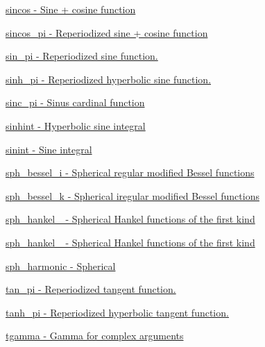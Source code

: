 \begin{DoxyItemize}
\item \hyperlink{group__gnu__math__spec__func_ga8041c24b528475bcf8a4178e484652a3}{sincos -\/ Sine + cosine function}
\item \hyperlink{group__gnu__math__spec__func_ga3152cfc9d5fa04fbe61781b45b3d4c04}{sincos\+\_\+pi -\/ Reperiodized sine + cosine function}
\item \hyperlink{group__gnu__math__spec__func_ga8fcd01a56e0c16d7568026c0bb4312eb}{sin\+\_\+pi -\/ Reperiodized sine function.}
\item \hyperlink{group__gnu__math__spec__func_gab004f7356231c96ae819d72e5d75b8dd}{sinh\+\_\+pi -\/ Reperiodized hyperbolic sine function.}
\item \hyperlink{group__gnu__math__spec__func_ga3dbc3831c1bd9f2a8be05496db9375a0}{sinc\+\_\+pi -\/ Sinus cardinal function}
\item \hyperlink{group__gnu__math__spec__func_ga203079a2b70127f16a8c434ea55d4e06}{sinhint -\/ Hyperbolic sine integral}
\item \hyperlink{group__gnu__math__spec__func_gaa588265d28710d36c7c4efa7d4f44ca4}{sinint -\/ Sine integral}
\item \hyperlink{group__gnu__math__spec__func_gad168511a86d4d25db99e2b08d5da038b}{sph\+\_\+bessel\+\_\+i -\/ Spherical regular modified Bessel functions}
\item \hyperlink{group__gnu__math__spec__func_ga9ad96c43b15e2c53d2f1b743e2eaa90f}{sph\+\_\+bessel\+\_\+k -\/ Spherical iregular modified Bessel functions}
\item \hyperlink{group__gnu__math__spec__func_ga04c91059810f366e3366fadef9084be7}{sph\+\_\+hankel\+\_ -\/ Spherical Hankel functions of the first kind}
\item \hyperlink{group__gnu__math__spec__func_gafb5debe7f7db9e9e456c065acf738f64}{sph\+\_\+hankel\+\_ -\/ Spherical Hankel functions of the first kind}
\item \hyperlink{group__gnu__math__spec__func_gadca3d25c4f7eed15099d8f80681d4055}{sph\+\_\+harmonic -\/ Spherical}
\item \hyperlink{group__gnu__math__spec__func_ga5029c1e804c1c9b28949b5ef00237c08}{tan\+\_\+pi -\/ Reperiodized tangent function.}
\item \hyperlink{group__gnu__math__spec__func_ga5f0c92cb16210a8d087327ff2c048115}{tanh\+\_\+pi -\/ Reperiodized hyperbolic tangent function.}
\item \hyperlink{group__gnu__math__spec__func_ga6133351c7602e917fd08d62d897e57d0}{tgamma -\/ Gamma for complex arguments}

\end{DoxyItemize}
